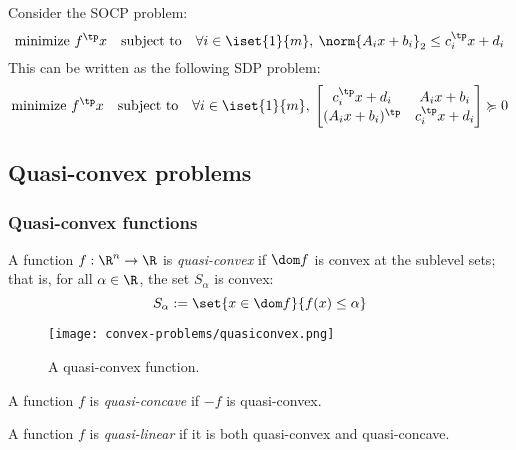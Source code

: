 \begin{property}
    Consider the SOCP problem:
    \begin{equation*}
        \text{minimize } f^\tp x \quad\text{subject to}\quad \forall i\in\iset{1}{m}, \: \norm{A_ix+b_i}_2\leq c_i^\tp x+d_i
    \end{equation*}
    This can be written as the following SDP problem:
    \begin{equation*}
        \text{minimize } f^\tp x \quad\text{subject to}\quad \forall i\in\iset{1}{m}, \: \begin{bmatrix}
            c_i^\tp x+d_i & A_ix+b_i\\
            (A_ix+b_i)^\tp & c_i^\tp x+d_i
        \end{bmatrix}\succcurlyeq0
    \end{equation*}
\end{property}

\subsection{Quasi-convex problems}
\subsubsection{Quasi-convex functions}
\begin{definition}
    A function $f:\R^n\to\R$ is \emph{quasi-convex} if $\dom f$ is convex at the sublevel sets; that is, for all $\alpha\in\R$, the set $S_\alpha$ is convex:
    \begin{equation*}
        S_\alpha := \set{x\in\dom f}{f(x)\leq\alpha}
    \end{equation*}
    \begin{figure}[H]
        \centering
        \texttt{[image: convex-problems/quasiconvex.png]}
        \caption{A quasi-convex function.}
    \end{figure}
\end{definition}

\begin{definition}
    A function $f$ is \emph{quasi-concave} if $-f$ is quasi-convex.
\end{definition}

\begin{definition}
    A function $f$ is \emph{quasi-linear} if it is both quasi-convex and quasi-concave.    
\end{definition}

